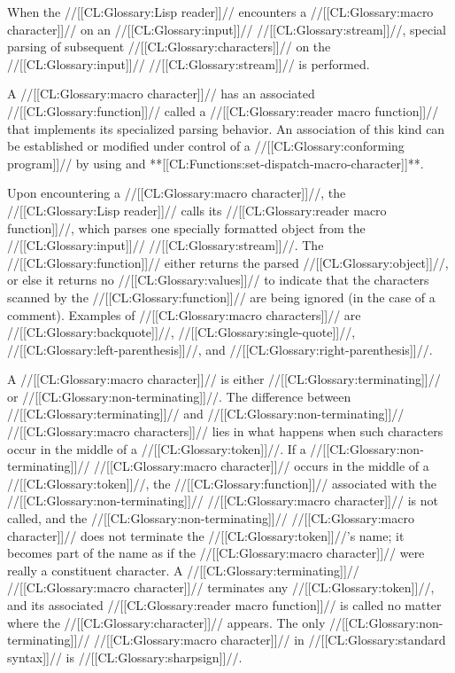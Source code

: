 {\endsubsubsection%

 

When the //[[CL:Glossary:Lisp reader]]// encounters a //[[CL:Glossary:macro character]]//  on an //[[CL:Glossary:input]]// //[[CL:Glossary:stream]]//, special parsing of subsequent //[[CL:Glossary:characters]]//  on the //[[CL:Glossary:input]]// //[[CL:Glossary:stream]]//  is performed.

A //[[CL:Glossary:macro character]]// has an associated //[[CL:Glossary:function]]// called a //[[CL:Glossary:reader macro function]]// that implements its specialized parsing behavior. An association of this kind can be established or modified under control of a //[[CL:Glossary:conforming program]]// by using   and **[[CL:Functions:set-dispatch-macro-character]]**.

Upon encountering a //[[CL:Glossary:macro character]]//, the //[[CL:Glossary:Lisp reader]]// calls its //[[CL:Glossary:reader macro function]]//, which parses one specially formatted object  from the //[[CL:Glossary:input]]// //[[CL:Glossary:stream]]//. The //[[CL:Glossary:function]]// either returns the parsed //[[CL:Glossary:object]]//, or else it returns no //[[CL:Glossary:values]]// 
    to indicate that the characters scanned by the //[[CL:Glossary:function]]//
    are being ignored (\eg in the case of a comment). Examples of //[[CL:Glossary:macro characters]]// are //[[CL:Glossary:backquote]]//, //[[CL:Glossary:single-quote]]//, //[[CL:Glossary:left-parenthesis]]//, and  //[[CL:Glossary:right-parenthesis]]//.

A //[[CL:Glossary:macro character]]// is either //[[CL:Glossary:terminating]]// or //[[CL:Glossary:non-terminating]]//. The difference between //[[CL:Glossary:terminating]]// and //[[CL:Glossary:non-terminating]]// //[[CL:Glossary:macro characters]]//  lies in what happens when such characters occur in the middle of a //[[CL:Glossary:token]]//.   If a //[[CL:Glossary:non-terminating]]// //[[CL:Glossary:macro character]]// occurs in the middle of a //[[CL:Glossary:token]]//, the //[[CL:Glossary:function]]// associated  with the //[[CL:Glossary:non-terminating]]// //[[CL:Glossary:macro character]]// is not called, and the //[[CL:Glossary:non-terminating]]// //[[CL:Glossary:macro character]]// does not terminate the //[[CL:Glossary:token]]//'s name; it becomes part of the name as if the //[[CL:Glossary:macro character]]// were really a constituent character.  A //[[CL:Glossary:terminating]]// //[[CL:Glossary:macro character]]// terminates any //[[CL:Glossary:token]]//, and its associated //[[CL:Glossary:reader macro function]]// is called no matter where the //[[CL:Glossary:character]]// appears. The only //[[CL:Glossary:non-terminating]]// //[[CL:Glossary:macro character]]// in //[[CL:Glossary:standard syntax]]//  is //[[CL:Glossary:sharpsign]]//.

}
